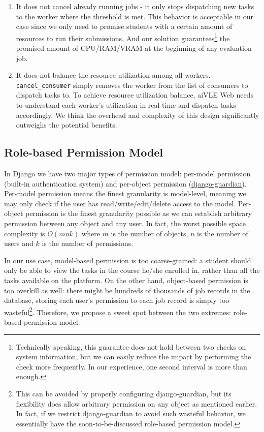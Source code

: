 \begin{enumerate}
    \item It does not cancel already running jobs - it only stops dispatching new tasks to the worker where the threshold is met. This behavior is acceptable in our case since we only need to promise students with a certain amount of resources to run their submissions. And our solution guarantees\footnote{Technically speaking, this guarantee does not hold between two checks on system information, but we can easily reduce the impact by performing the check more frequently. In our experience, one second interval is more than enough.} the promised amount of CPU/RAM/VRAM at the beginning of any evaluation job.
    \item It does not balance the resource utilization among all workers. \texttt{cancel\_consumer} simply removes the worker from the list of consumers to dispatch tasks to. To achieve resource utilization balance, aiVLE Web needs to understand each worker's utilization in real-time and dispatch tasks accordingly. We think the overhead and complexity of this design significantly outweighs the potential benefits.
\end{enumerate}

\subsection{Role-based Permission Model}
\label{ss:aivle-web-permission-model}
In Django we have two major types of permission model: per-model permission (built-in authentication system) and per-object permission (\href{https://github.com/django-guardian/django-guardian}{django-guardian}). Per-model permission means the finest granularity is model-level, meaning we may only check if the user has read/write/edit/delete access to the model. Per-object permission is the finest granularity possible as we can establish arbitrary permission between any object and any user. In fact, the worst possible space complexity is $O(mnk)$ where $m$ is the number of objects, $n$ is the number of users and $k$ is the number of permissions.

In our use case, model-based permission is too coarse-grained: a student should only be able to view the tasks in the course he/she enrolled in, rather than all the tasks available on the platform. On the other hand, object-based permission is too overkill as well: there might be hundreds of thousands of job records in the database, storing each user's permission to each job record is simply too wasteful\footnote{This can be avoided by properly configuring django-guardian, but its flexibility does allow arbitrary permission on any object as mentioned earlier. In fact, if we restrict django-guardian to avoid such wasteful behavior, we essentially have the soon-to-be-discussed role-based permission model.}. Therefore, we propose a sweet spot between the two extremes: role-based permission model.

